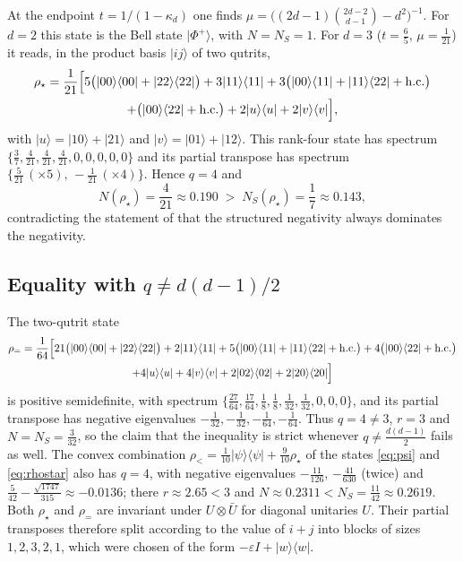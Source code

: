 \documentclass[11pt,a4paper]{article}
\theoremstyle{definition}
\theoremstyle{plain}
\newcommand{\ket}[1]{\lvert#1\rangle}
\newcommand{\ketbra}[2]{\lvert#1\rangle\langle#2\rvert}
\newcommand{\NS}{N_{S}}
\begin{document}
At the endpoint $t=1/(1-\kappa_d)$ one finds
$\mu=\bigl((2d-1)\binom{2d-2}{d-1}-d^2\bigr)^{-1}$. For $d=2$ this state is
the Bell state $\ket{\Phi^+}$, with $N=\NS=1$. For $d=3$ ($t=\frac65$,
$\mu=\frac1{21}$) it reads, in the product basis $\ket{ij}$ of two qutrits,
\begin{multline}\label{eq:rhostar}
\rho_\star=\frac1{21}\Bigl[5\bigl(\ketbra{00}{00}+\ketbra{22}{22}\bigr)
+3\ketbra{11}{11}
+3\bigl(\ketbra{00}{11}+\ketbra{11}{22}+\mathrm{h.c.}\bigr)\\
+\bigl(\ketbra{00}{22}+\mathrm{h.c.}\bigr)
+2\ketbra uu+2\ketbra vv\Bigr],
\end{multline}
with $\ket u=\ket{10}+\ket{21}$ and $\ket v=\ket{01}+\ket{12}$. This rank-four
state has spectrum $\{\frac37,\frac4{21},\frac4{21},\frac4{21},0,0,0,0,0\}$ and
its partial transpose has spectrum $\{\frac5{21}\,(\times5),\,-\frac1{21}\,(\times4)\}$.
Hence $q=4$ and
\[
N(\rho_\star)=\frac4{21}\approx0.190\;>\;\NS(\rho_\star)=\frac17\approx0.143,
\]
contradicting the statement of \cite{KumariAdhikari2022} that the structured
negativity always dominates the negativity.

\subsection{Equality with \texorpdfstring{$q\ne d(d-1)/2$}{q != d(d-1)/2}}
The two-qutrit state
\begin{multline}\label{eq:rhoeq}
\rho_{=}=\frac1{64}\Bigl[21\bigl(\ketbra{00}{00}+\ketbra{22}{22}\bigr)
+2\ketbra{11}{11}
+5\bigl(\ketbra{00}{11}+\ketbra{11}{22}+\mathrm{h.c.}\bigr)
+4\bigl(\ketbra{00}{22}+\mathrm{h.c.}\bigr)\\
+4\ketbra uu+4\ketbra vv+2\ketbra{02}{02}+2\ketbra{20}{20}\Bigr]
\end{multline}
is positive semidefinite, with spectrum
$\{\frac{27}{64},\frac{17}{64},\frac18,\frac18,\frac1{32},\frac1{32},0,0,0\}$, and
its partial transpose has negative eigenvalues
$-\frac1{32},-\frac1{32},-\frac1{64},-\frac1{64}$. Thus $q=4\ne3$, $r=3$ and
$N=\NS=\frac3{32}$, so the claim that the inequality is strict whenever
$q\ne\frac{d(d-1)}{2}$ fails as well. The convex combination
$\rho_<=\frac1{10}\ketbra\psi\psi+\frac9{10}\rho_\star$ of the states
\eqref{eq:psi} and \eqref{eq:rhostar} also has $q=4$, with negative
eigenvalues $-\frac{11}{126}$, $-\frac{41}{630}$ (twice) and
$\frac5{42}-\frac{\sqrt{1747}}{315}\approx-0.0136$; there $r\approx2.65<3$
and $N\approx0.2311<\NS=\frac{11}{42}\approx0.2619$. Both $\rho_\star$ and $\rho_=$ are
invariant under $U\otimes\bar U$ for diagonal unitaries $U$. Their partial
transposes therefore split according to the value of $i+j$ into blocks of
sizes $1,2,3,2,1$, which were chosen of the form $-\varepsilon I+\ketbra ww$.
\end{document}
